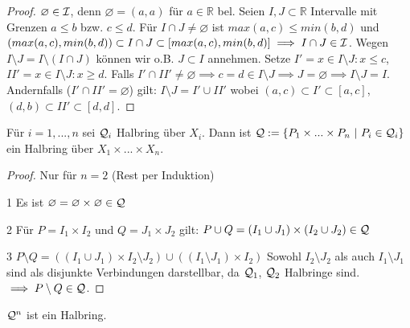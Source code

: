   \begin{proof}
    $\varnothing \in \mathcal{I}$, denn $\varnothing = (a,a)$ für $a \in \mathbb{R}$ bel. Seien $I,J \subset \mathbb{R}$ Intervalle mit Grenzen $a \leq b$ bzw. $c \leq d$. Für $I \cap J \neq \varnothing$ ist $max(a,c) \leq min(b,d)$ und $(max(a,c), min(b,d)) \subset I\cap J \subset [max(a,c), min(b,d)] \implies I\cap J \in \mathcal{I}$. \newline
    Wegen $I\setminus J = I\setminus (I\cap J)$ können wir o.B. $J\subset I$ annehmen. \newline Setze $I' = {x\in I\setminus J: x \leq c}$, $II' = {x\in I\setminus J: x \geq d}$. \newline
  Falls $I' \cap II' \neq \varnothing \implies c = d \in I\setminus J \implies J=\varnothing \implies I\setminus J = I$. \newline 
Andernfalls ($I' \cap II' = \varnothing$) gilt: 
$I\setminus J = I' \cup II'$ wobei $(a,c)\subset I' \subset [a,c]$, $(d,b) \subset II' \subset [d,d]$. \end{proof}

  \begin{theorem}[i.A. II.20]
    Für $i = 1, ..., n$ sei $\mathcal{Q}_i$ Halbring über $X_i$. Dann ist $\mathcal{Q}:=\{P_1 \times ... \times P_n \ | \ P_i \in \mathcal{Q}_i\}$ ein Halbring über $X_1 \times ... \times X_n$.
  \end{theorem}

  \begin{proof}
Nur für $n = 2$ (Rest per Induktion) \newline
\item[1] Es ist $\varnothing = \varnothing\times\varnothing\in\mathcal{Q}$
\item[2] Für $P=I_1\times I_2$ und $Q = J_1 \times J_2$ gilt: $ P\cup Q = (I_1 \cup J_1) \times (I_2 \cup J_2) \in \mathcal{Q}$
\item[3] $P\setminus Q = ((I_1 \cup J_1)\times I_2\setminus J_2) \cup ((I_1\setminus J_1)\times I_2)$ \newline
Sowohl $I_2\setminus J_2$ als auch $I_1 \setminus J_1$ sind als disjunkte Verbindungen darstellbar, da $\mathcal{Q}_1$, $\mathcal{Q}_2$ Halbringe sind. $\implies P\setminus Q \in \mathcal{Q}$.
  \end{proof}

  \begin{theorem}[i.A. II.21]
    $\mathcal{Q}^n$ ist ein Halbring.
  \end{theorem}


